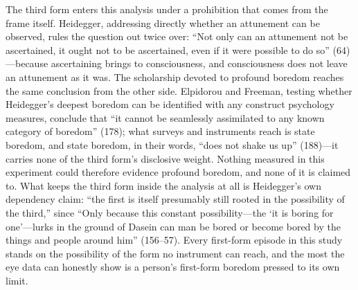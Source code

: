 The third form enters this analysis under a prohibition that comes from the frame itself.
Heidegger, addressing directly whether an attunement can be observed, rules the question out
twice over: ``Not only can an attunement not be ascertained, it ought not to be ascertained,
even if it were possible to do so'' (64)---because ascertaining brings to consciousness, and
consciousness does not leave an attunement as it was. The scholarship devoted to profound
boredom reaches the same conclusion from the other side. Elpidorou and Freeman, testing
whether Heidegger's deepest boredom can be identified with any construct psychology measures,
conclude that ``it cannot be seamlessly assimilated to any known category of boredom'' (178);
what surveys and instruments reach is state boredom, and state boredom, in their words, ``does
not shake us up'' (188)---it carries none of the third form's disclosive weight. Nothing
measured in this experiment could therefore evidence profound boredom, and none of it is claimed to.
What keeps the third form inside the analysis at all is Heidegger's own dependency claim:
``the first is itself presumably still rooted in the possibility of the third,'' since ``Only
because this constant possibility---the `it is boring for one'---lurks in the ground of Dasein
can man be bored or become bored by the things and people around him'' (156--57). Every
first-form episode in this study stands on the possibility of the form no instrument can
reach, and the most the eye data can honestly show is a person's first-form boredom pressed
to its own limit.

